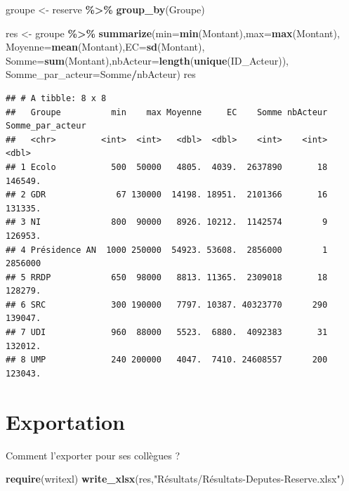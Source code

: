\documentclass[
]{book}
\newenvironment{Shaded}{\begin{snugshade}}{\end{snugshade}}
\newcommand{\AttributeTok}[1]{\textcolor[rgb]{0.13,0.29,0.53}{#1}}
\newcommand{\FunctionTok}[1]{\textcolor[rgb]{0.13,0.29,0.53}{\textbf{#1}}}
\newcommand{\NormalTok}[1]{#1}
\newcommand{\OtherTok}[1]{\textcolor[rgb]{0.56,0.35,0.01}{#1}}
\newcommand{\SpecialCharTok}[1]{\textcolor[rgb]{0.81,0.36,0.00}{\textbf{#1}}}
\newcommand{\StringTok}[1]{\textcolor[rgb]{0.31,0.60,0.02}{#1}}
\begin{document}
\begin{Shaded}
\begin{Highlighting}[]
\NormalTok{groupe }\OtherTok{\textless{}{-}}\NormalTok{ reserve }\SpecialCharTok{\%\textgreater{}\%} \FunctionTok{group\_by}\NormalTok{(Groupe)}

\NormalTok{res }\OtherTok{\textless{}{-}}\NormalTok{ groupe }\SpecialCharTok{\%\textgreater{}\%} \FunctionTok{summarize}\NormalTok{(}\AttributeTok{min=}\FunctionTok{min}\NormalTok{(Montant),}\AttributeTok{max=}\FunctionTok{max}\NormalTok{(Montant),}
                     \AttributeTok{Moyenne=}\FunctionTok{mean}\NormalTok{(Montant),}\AttributeTok{EC=}\FunctionTok{sd}\NormalTok{(Montant),}
                     \AttributeTok{Somme=}\FunctionTok{sum}\NormalTok{(Montant),}\AttributeTok{nbActeur=}\FunctionTok{length}\NormalTok{(}\FunctionTok{unique}\NormalTok{(ID\_Acteur)),}
                     \AttributeTok{Somme\_par\_acteur=}\NormalTok{Somme}\SpecialCharTok{/}\NormalTok{nbActeur)}
\NormalTok{res }
\end{Highlighting}
\end{Shaded}

\begin{verbatim}
## # A tibble: 8 x 8
##   Groupe          min    max Moyenne     EC    Somme nbActeur Somme_par_acteur
##   <chr>         <int>  <int>   <dbl>  <dbl>    <int>    <int>            <dbl>
## 1 Ecolo           500  50000   4805.  4039.  2637890       18          146549.
## 2 GDR              67 130000  14198. 18951.  2101366       16          131335.
## 3 NI              800  90000   8926. 10212.  1142574        9          126953.
## 4 Présidence AN  1000 250000  54923. 53608.  2856000        1         2856000 
## 5 RRDP            650  98000   8813. 11365.  2309018       18          128279.
## 6 SRC             300 190000   7797. 10387. 40323770      290          139047.
## 7 UDI             960  88000   5523.  6880.  4092383       31          132012.
## 8 UMP             240 200000   4047.  7410. 24608557      200          123043.
\end{verbatim}

\hypertarget{exportation-1}{%
\section{Exportation}\label{exportation-1}}

Comment l'exporter pour ses collègues ?

\begin{Shaded}
\begin{Highlighting}[]
\FunctionTok{require}\NormalTok{(writexl)}
\FunctionTok{write\_xlsx}\NormalTok{(res,}\StringTok{"Résultats/Résultats{-}Deputes{-}Reserve.xlsx"}\NormalTok{)}
\end{Highlighting}
\end{Shaded}
\end{document}
